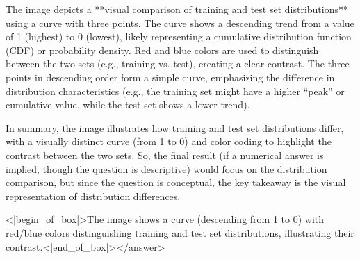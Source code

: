 The image depicts a **visual comparison of training and test set distributions** using a curve with three points. The curve shows a descending trend from a value of 1 (highest) to 0 (lowest), likely representing a cumulative distribution function (CDF) or probability density. Red and blue colors are used to distinguish between the two sets (e.g., training vs. test), creating a clear contrast. The three points in descending order form a simple curve, emphasizing the difference in distribution characteristics (e.g., the training set might have a higher “peak” or cumulative value, while the test set shows a lower trend).  

In summary, the image illustrates how training and test set distributions differ, with a visually distinct curve (from 1 to 0) and color coding to highlight the contrast between the two sets.  
So, the final result (if a numerical answer is implied, though the question is descriptive) would focus on the distribution comparison, but since the question is conceptual, the key takeaway is the visual representation of distribution differences.  

<|begin_of_box|>The image shows a curve (descending from 1 to 0) with red/blue colors distinguishing training and test set distributions, illustrating their contrast.<|end_of_box|></answer>